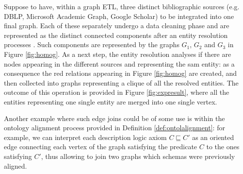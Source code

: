 \begin{example}
	Suppose to have, within a graph ETL, three distinct bibliographic 
	sources (e.g. DBLP, Microsoft Academic Graph, Google Scholar)
	to be integrated into one final graph. 
	Each of these separately undergo a data cleaning phase
	and are represented as the distinct connected components after an entity resolution processes \cite{markus}. Such components are represented by the graphs $G_1$, $G_2$ and $G_3$ in Figure \ref{fig:homog}.
	As a next step, the entity resolution \cite{ALIEH17} analyses if there are
	nodes appearing  in the different sources and representing 
	the sam entity: as a consequence the red relations  appearing in
	Figure \ref{fig:homog} are created, and then collected into graphs representing a clique of all the resolved entities. The outcome of this operation is provided in Figure \vref{fig:expresult}, where all the entities representing one single entity are merged into one single vertex.
\end{example}

Another example where such edge joins could be of some use is within the ontology alignment process provided in Definition \vref{def:ontolalignment}: for example, we can interpret each description logic axiom $C\sqsubseteq C'$ as an oriented edge connecting each vertex of the graph satisfying the predicate $C$ to the ones satisfying $C'$, thus allowing to join two graphs which schemas were previously aligned.

